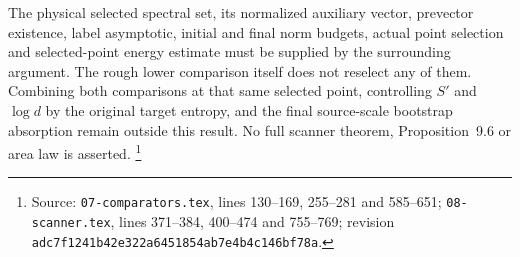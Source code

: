 \documentclass{article}
\begin{document}
The physical selected spectral set, its normalized auxiliary vector,
prevector existence, label asymptotic, initial and final norm budgets,
actual point selection and selected-point energy estimate must be
supplied by the surrounding argument.
The rough lower comparison itself does not reselect any of them.
Combining both comparisons at that same selected point, controlling
$S'$ and $\log d$ by the original target entropy, and the final
source-scale bootstrap absorption remain outside this result.
No full scanner theorem, Proposition~9.6 or area law is asserted.
\footnote{Source: \texttt{07-comparators.tex}, lines 130--169,
    255--281 and 585--651; \texttt{08-scanner.tex}, lines 371--384,
    400--474 and 755--769; revision
    \texttt{adc7f1241b42e322a6451854ab7e4b4c146bf78a}.}



\end{document}
